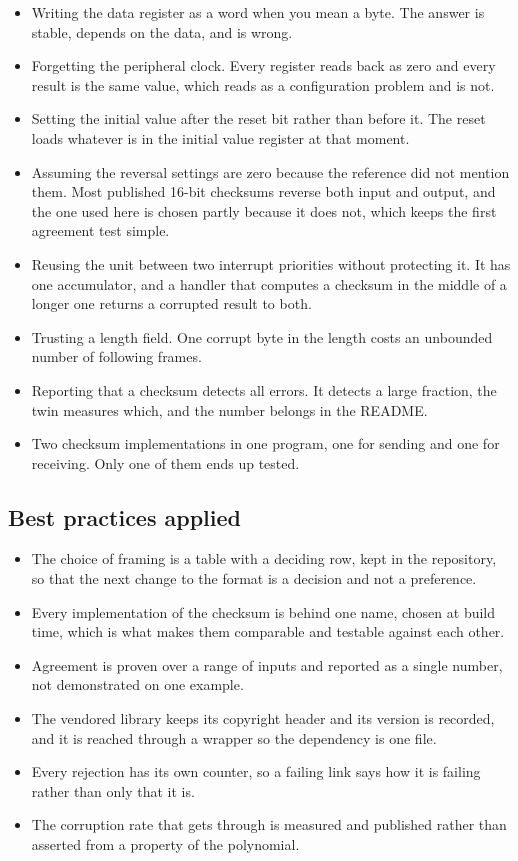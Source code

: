 \begin{itemize}
\item Writing the data register as a word when you mean a byte. The answer is
stable, depends on the data, and is wrong.
\item Forgetting the peripheral clock. Every register reads back as zero and
every result is the same value, which reads as a configuration problem and is
not.
\item Setting the initial value after the reset bit rather than before it. The
reset loads whatever is in the initial value register at that moment.
\item Assuming the reversal settings are zero because the reference did not
mention them. Most published 16-bit checksums reverse both input and output, and
the one used here is chosen partly because it does not, which keeps the first
agreement test simple.
\item Reusing the unit between two interrupt priorities without protecting it.
It has one accumulator, and a handler that computes a checksum in the middle of
a longer one returns a corrupted result to both.
\item Trusting a length field. One corrupt byte in the length costs an
unbounded number of following frames.
\item Reporting that a checksum detects all errors. It detects a large fraction,
the twin measures which, and the number belongs in the README.
\item Two checksum implementations in one program, one for sending and one for
receiving. Only one of them ends up tested.
\end{itemize}

\subsection*{Best practices applied}

\begin{itemize}
\item The choice of framing is a table with a deciding row, kept in the
repository, so that the next change to the format is a decision and not a
preference.
\item Every implementation of the checksum is behind one name, chosen at build
time, which is what makes them comparable and testable against each other.
\item Agreement is proven over a range of inputs and reported as a single
number, not demonstrated on one example.
\item The vendored library keeps its copyright header and its version is
recorded, and it is reached through a wrapper so the dependency is one file.
\item Every rejection has its own counter, so a failing link says how it is
failing rather than only that it is.
\item The corruption rate that gets through is measured and published rather
than asserted from a property of the polynomial.
\end{itemize}

